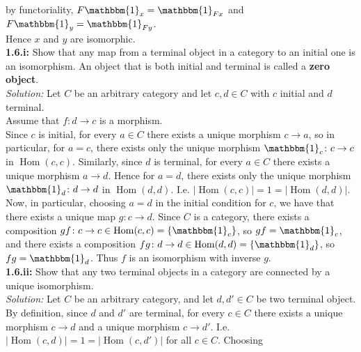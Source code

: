 \documentclass[a4paper]{article}
\DeclareMathOperator{\Hom}{Hom}
\begin{document}
     by functoriality, 
     $F \mathbbm{1}_x = \mathbbm{1}_{Fx}$ and
     $F \mathbbm{1}_y = \mathbbm{1}_{Fy}$.\\
     Hence $x$ and $y$ are isomorphic.\\
     \linebreak
     \textbf{1.6.i:} Show that any map from a terminal object in a category
     to an initial one is an isomorphism. An object that is both 
     initial and terminal is called a \textbf{zero object}.\\
     \linebreak
     \textit{Solution:} Let $C$ be an arbitrary category
     and let $c,d \in C$ with $c$ initial and $d$ terminal.\\
     Assume that $f  \colon d \to c$ is a morphism.\\
     Since $c$ is initial, for every $a \in C$ there
     exists a unique morphism $c \to a$, so in particular, for
     $a = c$, there exists only the unique morphism
     $\mathbbm{1}_{c}  \colon c \to c$ 
     in $\Hom (c,c)$. Similarly, since
     $d$ is terminal, for every $a \in C$ there exists
     a unique morphism $a \to d$. Hence for $a = d$, there
     exists only the unique morphism $\mathbbm{1}_{d}  \colon 
     d \to d$ in $\Hom (d,d)$. I.e.  $\left| 
     \Hom (c,c) \right| = 1 = \left| \Hom (d,d) \right|$.\\
     Now, in particular, choosing
     $a = d$ in the initial condition for $c$, 
     we have that there exists a unique map
     $g  \colon c \to d$. Since $C$ is a category,
     there exists a composition
     $gf  \colon c\to c \in \Hom (c,c) = \left\{ \mathbbm{1}_c \right\} $,
     so $gf = \mathbbm{1}_c$, and
     there exists a composition
     $fg  \colon d\to d \in \Hom(d,d) = \left\{ \mathbbm{1}_d \right\} $,
     so $fg = \mathbbm{1}_d$. Thus
     $f$ is an isomorphism with inverse $g$.\\
     \linebreak
     \textbf{1.6.ii:} Show that any two terminal objects
     in a category are connected by a unique
     isomorphism.\\
     \linebreak
     \textit{Solution:} Let $C$ be an arbitrary category, and
     let $d, d' \in C$ be two terminal object.\\
     By definition, since $d$ and $d'$ are terminal, for every
     $c \in C$ there exists a unique
     morphism $c \to d$ and a unique morphism
     $c \to d'$. I.e.  $\left| \Hom(c,d) \right| =
     1 = \left| \Hom (c,d') \right| $ for all $c \in C$. Choosing
\end{document}
